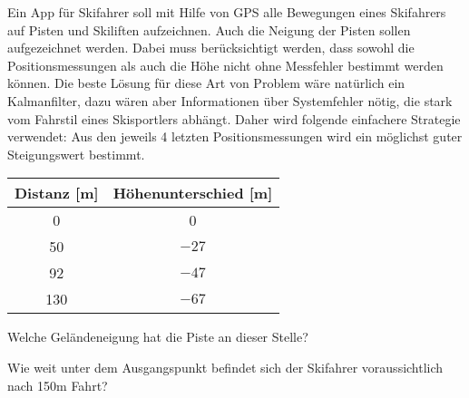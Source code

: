 Ein App für Skifahrer soll mit Hilfe von GPS alle Bewegungen
eines Skifahrers auf Pisten und Skiliften aufzeichnen.
Auch die Neigung der Pisten sollen aufgezeichnet werden.
Dabei muss berücksichtigt werden, dass sowohl die
Positionsmessungen als auch die Höhe nicht ohne Messfehler
bestimmt werden können.  Die beste Lösung für diese Art
von Problem wäre natürlich ein Kalmanfilter, dazu wären
aber Informationen über Systemfehler nötig, die stark vom Fahrstil
eines Skisportlers abhängt.  Daher wird folgende einfachere
Strategie verwendet: Aus den jeweils 4 letzten Positionsmessungen
wird ein möglichst guter Steigungswert bestimmt.
\begin{center}
\begin{tabular}{cc}
Distanz [m]&Höhenunterschied [m]\\
\hline
 0&    0\\
50&$-27$\\
92&$-47$\\
130&$-67$\\
\hline
\end{tabular}
\end{center}
\begin{teilaufgaben}
\item
Welche Geländeneigung hat die Piste an dieser Stelle?
\item
Wie weit unter dem Ausgangspunkt befindet sich der Skifahrer
voraussichtlich nach 150m Fahrt?
\end{teilaufgaben}


